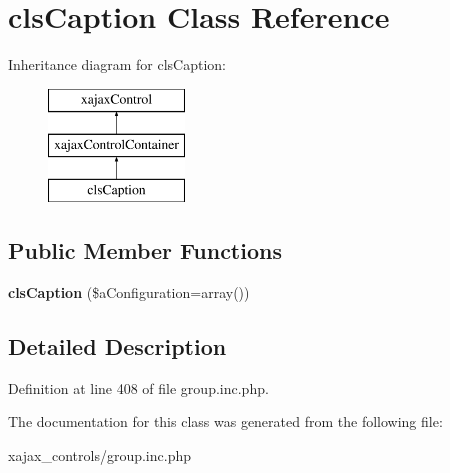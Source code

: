 \hypertarget{classclsCaption}{
\section{clsCaption Class Reference}
\label{classclsCaption}
}
Inheritance diagram for clsCaption:\begin{figure}[H]
\begin{center}
\leavevmode
\includegraphics[height=3.000000cm]{classclsCaption}
\end{center}
\end{figure}
\subsection*{Public Member Functions}
\begin{DoxyCompactItemize}
\item 
\hypertarget{classclsCaption_a4742139d35099b8f7f31eacb121615c1}{
{\bfseries clsCaption} (\$aConfiguration=array())}
\label{classclsCaption_a4742139d35099b8f7f31eacb121615c1}

\end{DoxyCompactItemize}


\subsection{Detailed Description}


Definition at line 408 of file group.inc.php.



The documentation for this class was generated from the following file:\begin{DoxyCompactItemize}
\item 
xajax\_\-controls/group.inc.php\end{DoxyCompactItemize}
